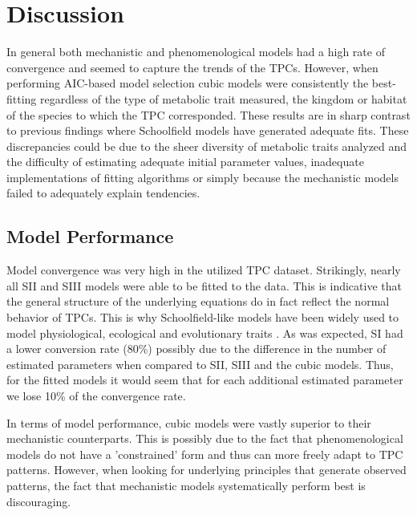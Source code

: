 \documentclass[11pt]{article}  %
\begin{document}

\section*{Discussion}

In general both mechanistic and phenomenological models had a high rate of convergence and seemed to capture the trends  of the TPCs. However, when performing AIC-based model selection cubic models were consistently the best-fitting regardless of the type of metabolic trait measured, the kingdom or habitat of the species to which the TPC corresponded. These results are in sharp contrast to previous findings where Schoolfield models have generated adequate fits. These discrepancies could be due to the sheer diversity of metabolic traits analyzed and the difficulty of estimating adequate initial parameter values, inadequate implementations of fitting algorithms or simply because the mechanistic models failed to adequately explain tendencies. 

\subsection*{Model Performance}

Model convergence was very high in the utilized TPC dataset. Strikingly, nearly all SII and SIII models were able to be fitted to the data. This is indicative that the general structure of the underlying equations do in fact reflect the normal behavior of TPCs. This is why Schoolfield-like models have been widely used to model physiological, ecological and evolutionary traits \cite{Dell,Gillooly,Regniere,Gillooly2,Savage}. As was expected, SI had a lower conversion rate (80\%) possibly due to the difference in the number of estimated parameters when compared to SII, SIII and the cubic models. Thus, for the fitted models it would seem that for each additional estimated parameter we lose 10\% of the convergence rate.

In terms of model performance, cubic models were vastly superior to their mechanistic counterparts. This is possibly due to the fact that phenomenological models do not have a 'constrained' form and thus can more freely adapt to TPC patterns. However, when looking for underlying principles that generate observed patterns, the fact that mechanistic models systematically perform best is discouraging. 
\end{document}
